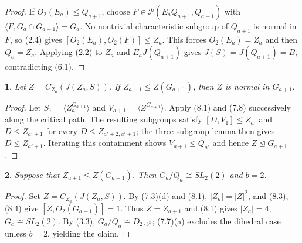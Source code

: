 \documentclass[11pt]{article}
\theoremstyle{plain}
\theoremstyle{stmplain}
\newtheorem{stm}{}[section]
\begin{document}
\begin{proof}
If $O_2(E_a)\le Q_{a+1}$, choose
$F\in\mathcal P(E_aQ_{a+1},Q_{a+1})$ with
$\langle F,G_a\cap G_{a+1}\rangle=G_a$. No nontrivial characteristic
subgroup of $Q_{a+1}$ is normal in $F$, so (2.4) gives
$[O_2(E_a),O_2(F)]\le Z_a$. This forces $O_2(E_a)=Z_a$ and then
$Q_a=Z_a$. Applying (2.2) to $Z_a$ and $E_aJ(Q_{a+1})$ gives
$J(S)=J(Q_{a+1})=B$, contradicting (6.1).
\end{proof}

\begin{stm}\label{st:8.4}
Let $Z=C_{Z_a}(J(Z_a,S))$. If $Z_{a+1}\le Z(G_{a+1})$, then $Z$ is normal
in $G_{a+1}$.
\end{stm}

\begin{proof}
Let $S_1=\langle Z_a^{G_{a+1}}\rangle$ and
$V_{a+1}=\langle Z^{G_{a+1}}\rangle$. Apply (8.1) and (7.8) successively
along the critical path. The resulting subgroups satisfy
$[D,V_1]\le Z_{a'}$ and $D\le Z_{a'+1}$ for every
$D\le Z_{a'+2,a'+1}$; the three-subgroup lemma then gives
$D\le Z_{a'+1}$. Iterating this containment shows
$V_{a+1}\le Q_{a'}$ and hence $Z\trianglelefteq G_{a+1}$.
\end{proof}

\begin{stm}\label{st:8.5}
Suppose that $Z_{a+1}\le Z(G_{a+1})$. Then
$G_a/Q_a\cong SL_2(2)$ and $b=2$.
\end{stm}

\begin{proof}
Set $Z=C_{Z_a}(J(Z_a,S))$. By (7.3)(d) and (8.1),
$|Z_a|=|Z|^2$, and (8.3),(8.4) give
$[Z,O_2(G_{a+1})]=1$. Thus $Z=Z_{a+1}$ and (8.1) gives
$|Z_a|=4$, $G_a\cong SL_2(2)$. By (3.3),
$G_a/Q_a\cong D_{2\cdot3^n}$; (7.7)(a) excludes the dihedral case
unless $b=2$, yielding the claim.
\end{proof}
\end{document}
